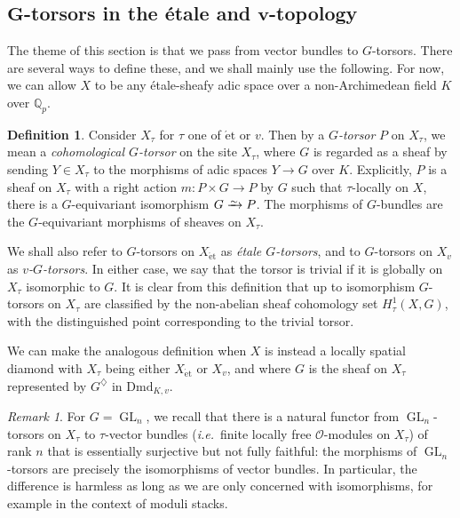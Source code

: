 \documentclass[10pt,a4paper]{article}
\theoremstyle{definition}
\newtheorem{Definition}[thm]{Definition}
\theoremstyle{remark}
\newtheorem{Remark}[thm]{Remark}
\newcommand*{\lowsim}{\vbox to 0pt{\vss\hbox{$\scriptstyle\sim$}\vskip-2pt}}
\newcommand*{\isomarrow}{\xrightarrow{\lowsim}}
\renewcommand{\O}{\mathcal{O}}
\newcommand{\Q}{\mathbb{Q}}
\newcommand{\GL}{\operatorname{GL}}
\newcommand{\et}{{\operatorname{\acute{e}t}}}
\newcommand{\Dmd}{\mathrm{Dmd}}
\numberwithin{equation}{section}
\begin{document}
\subsection{$\boldsymbol{G}$-torsors in the \'etale and $\boldsymbol{v}$-topology}\label{s:G-torsors}
The theme of this section is that we pass from vector bundles to $G$-torsors. There are several ways to define these, and we shall mainly use the following. For now, we can allow $X$ to be any \'etale-sheafy adic space over a non-Archimedean field $K$ over $\Q_p$.


\begin{Definition}\label{d:G-torsors}
	Consider $X_{\tau}$ for $\tau$ one of $\et$ or $v$. Then by a \emph{$G$-torsor} $P$ on $X_{\tau}$, we mean a \emph{cohomological $G$-torsor} on the site $X_{\tau}$, where $G$ is regarded as a sheaf by sending $Y\in X_\tau$ to the morphisms of adic spaces $Y\to G$ over $K$. Explicitly, $P$ is a sheaf on $X_{\tau}$ with a right action $m\colon P\times G\to P$ by $G$ such that $\tau$-locally on $X$, there is a $G$-equivariant isomorphism $G\isomarrow P$. The morphisms of $G$-bundles are the $G$-equivariant morphisms of sheaves on $X_{\tau}$.
	
	We shall also refer to $G$-torsors on $X_{\et}$ as \emph{\'etale $G$-torsors}, and  to $G$-torsors on $X_{v}$ as \emph{$v$-$G$-torsors}.
	In either case, we say that the torsor is trivial if it is globally on $X_\tau$ isomorphic to $G$. 
	It is clear from this definition that up to isomorphism $G$-torsors on $X_{\tau}$  are classified by the non-abelian sheaf cohomology set 
	$H^1_{\tau}(X,G)$, with the distinguished point corresponding to the trivial torsor.
	
	We can make the analogous definition when $X$ is instead a locally spatial diamond with $X_\tau$ being either $X_\et$ or $X_v$, and where $G$ is the sheaf on $X_\tau$ represented by $G^\diamondsuit$ in $\Dmd_{K,v}$.
\end{Definition}

\begin{Remark}\label{r:GL_n-torsor-vs-vector-torsor}
	For $G=\GL_n$, we recall that there is a natural functor from $\GL_n$-torsors on $X_{\tau}$ to $\tau$-vector bundles (\textit{i.e.}~finite locally free $\O$-modules on $X_\tau$) of rank $n$ that is essentially surjective but not fully faithful: the morphisms of $\GL_n$-torsors are precisely the isomorphisms of vector bundles. In particular, the difference is harmless as long as we are only concerned with isomorphisms, for example in the context of moduli stacks.
\end{Remark}
\end{document}
